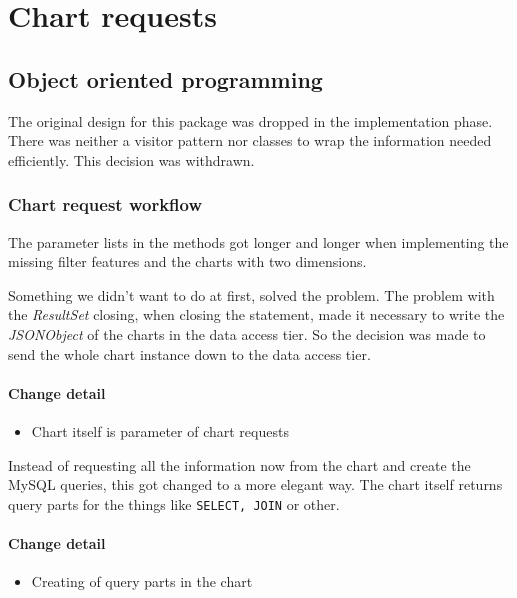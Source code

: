 \section{Chart requests}




\subsection{Object oriented programming}
The original design for this package was dropped in the implementation phase.
There was neither a visitor pattern nor classes to wrap the information
needed efficiently. This decision was withdrawn.

\subsubsection{Chart request workflow} \label{chart}
The parameter lists in the methods got longer 
and longer when implementing the missing filter features
and the charts with two dimensions.

Something we didn't want to do at first, solved the problem. The problem 
with the \textit{ResultSet} closing, when closing the statement, made it
necessary to write the \textit{JSONObject} of the charts in the
data access tier. So the decision was made to send the whole chart instance
down to the data access tier. 

\paragraph{Change detail}
\begin{itemize}
  \item Chart itself is parameter of chart requests
\end{itemize}

Instead of requesting all the information now from the chart
and create the MySQL queries, this got changed to a more  elegant way.
The chart itself returns query parts for the things like \texttt{SELECT, JOIN} or other.

\paragraph{Change detail}
\begin{itemize}
  \item Creating of query parts in the chart
\end{itemize}

